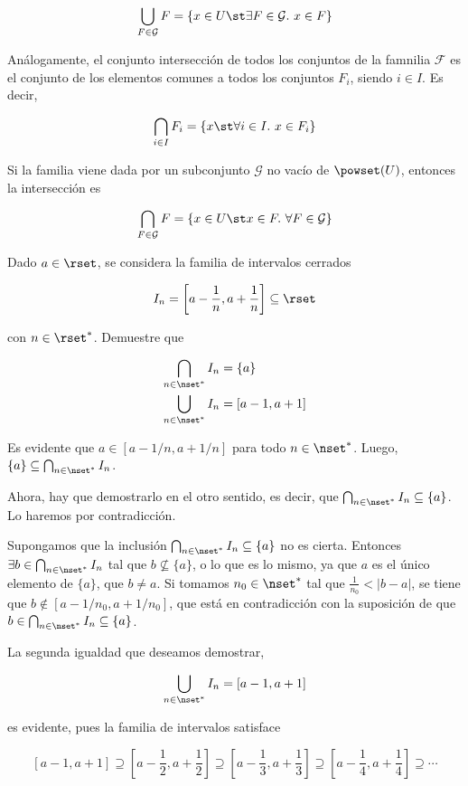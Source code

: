 $$ \bigcup_{F \in \mathcal{G}} F = \{x \in U \st \exists F \in \mathcal{G}.
\ x \in F\} $$

Análogamente, el conjunto intersección de todos los conjuntos de la famnilia
$\mathcal{F}$ es el conjunto de los elementos comunes a todos los conjuntos
$F_i$, siendo $i \in I$. Es decir,

$$ \bigcap_{i \in I} F_i = \{x \st \forall i \in I. \ x \in F_i\} $$

Si la familia viene dada por un subconjunto $\mathcal{G}$ no vacío de
$\powset(U)$, entonces la intersección es

$$ \bigcap_{F \in \mathcal{G}} F = \{x \in U \st x \in F. \ \forall F \in
\mathcal{G}\} $$

\begin{exercise}
  Dado $a \in \rset$, se considera la familia de intervalos cerrados

  \[ I_n = \left[ a - \frac{1}{n}, a + \frac{1}{n} \right] \subseteq \rset
  \]

  \noindent con $n \in \rset^*$. Demuestre que

  \begin{align*}
    \bigcap_{n \in \nset^*} I_n &= \{a\} \\
    \bigcup_{n \in \nset^*} I_n &= [a - 1, a + 1] \\
  \end{align*}

  Es evidente que $a \in \left[ a - 1/n, a + 1/n \right]$ para todo $n \in
  \nset^*$. Luego, $\{a\} \subseteq \bigcap_{n \in \nset^*} I_n$.

  Ahora, hay que demostrarlo en el otro sentido, es decir, que $\bigcap_{n
  \in \nset^*} I_n \subseteq \{a\}$. Lo haremos por contradicción.

  Supongamos que la inclusión $\bigcap_{n \in \nset^*} I_n \subseteq \{a\}$
  no es cierta. Entonces $\exists b \in \bigcap_{n \in \nset^*} I_n$ tal que
  $b \not\subseteq \{a\}$, o lo que es lo mismo, ya que $a$ es el único
  elemento de $\{a\}$, que $b \neq a$. Si tomamos $n_0 \in \nset^*$ tal que
  $\frac{1}{n_0} < |b - a|$, se tiene que $b \notin \left[ a - 1/n_0, a +
  1/n_0 \right]$, que está en contradicción con la suposición de que $b \in
  \bigcap_{n \in \nset^*} I_n \subseteq \{a\}$.

  La segunda igualdad que deseamos demostrar,

  \[ \bigcup_{n \in \nset^*} I_n = \left[a - 1, a + 1 \right] \]

  \noindent es evidente, pues la familia de intervalos satisface

  \[ [a - 1, a + 1] \supseteq \left[ a - \frac{1}{2}, a + \frac{1}{2}
  \right] \supseteq \left[ a - \frac{1}{3}, a + \frac{1}{3} \right]
  \supseteq \left[ a - \frac{1}{4}, a + \frac{1}{4} \right] \supseteq \cdots
  \]
\end{exercise}






